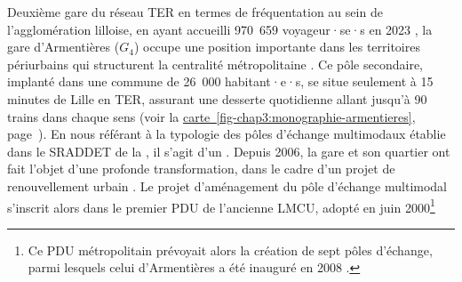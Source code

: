 \begin{refsegment}
Deuxième gare du réseau \acrshort{TER} en termes de fréquentation au sein de l'agglomération lilloise, en ayant accueilli 970~659 voyageur·se·s en 2023 \textcolor{blue}{\autocite{sncf_frequentation_2024}}, la gare d’Armentières (\(G_4\)) occupe une position importante dans les territoires périurbains qui structurent la centralité métropolitaine \textcolor{blue}{\autocite[988]{hasiak_can_2021}}. Ce pôle secondaire, implanté dans une commune de 26~000 habitant·e·s, se situe seulement à 15 minutes de Lille en \acrshort{TER}, assurant une desserte quotidienne allant jusqu’à 90 trains dans chaque sens (voir la \hyperref[fig-chap3:monographie-armentieres]{carte~\ref{fig-chap3:monographie-armentieres}}, page~\pageref{fig-chap3:monographie-armentieres}). En nous référant à la typologie des pôles d'échange multimodaux établie dans le \acrshort{SRADDET} de la \textcolor{blue}{\textcite[82]{region_hauts-de-france_sraddet_2024}}, il s'agit d'un . Depuis 2006, la gare et son quartier ont fait l'objet d'une profonde transformation, dans le cadre d'un projet de renouvellement urbain \textcolor{blue}{\autocite[90]{schmitt_marches_2020}}. Le projet d'aménagement du pôle d'échange multimodal s'inscrit alors dans le premier \acrfull{PDU} de l'ancienne \acrfull{LMCU}, adopté en juin 2000\footnote{
    Ce \acrshort{PDU} métropolitain prévoyait alors la création de sept pôles d'échange, parmi lesquels celui d'Armentières a été inauguré en 2008 \textcolor{blue}{\autocite[90]{schmitt_marches_2020}}.
}
\end{refsegment}
